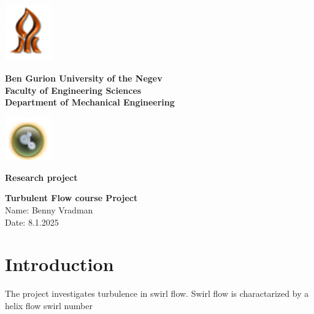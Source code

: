 \documentclass{article}
\begin{document}
\thispagestyle{empty}
\setlength{\parindent}{0pt}

\noindent
\includegraphics[width=2cm]{Picture1.png}%
\hfill
\begin{minipage}[c]{0.75\textwidth}
  \centering
  {\bfseries\LARGE Ben Gurion University of the Negev}\\
\vspace{0.3cm}  
{\bfseries\Large Faculty of Engineering Sciences}\\
\vspace{0.3cm}
{\bfseries\large Department of Mechanical Engineering}
\end{minipage}
\hfill
\includegraphics[width=2cm]{Picture2.png}

\vspace{2cm}

\begin{center}
    { \bfseries\large Research project}\\
\end{center}

\vspace{3cm}

\begin{center}
    { \bfseries\huge Turbulent Flow course Project}\\
\vspace{1cm}
{\large Name: Benny Vradman}\\
\vspace{1cm}
{\large Date: 8.1.2025}
\end{center}
\newpage
{}
\setcounter{page}{1}

\section{Introduction}
The project investigates turbulence in swirl flow. Swirl flow is charactarized by a helix flow swirl number 
\end{document}
